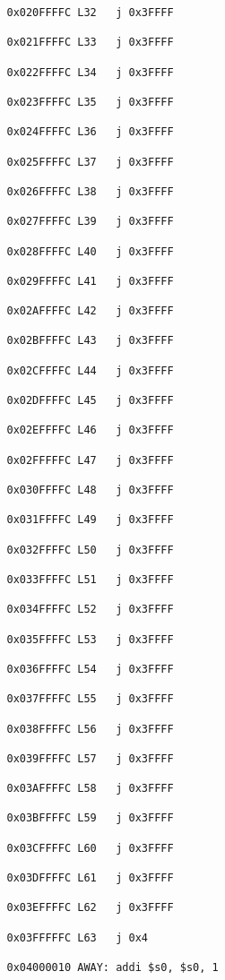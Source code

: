 \documentclass{article}
\begin{document}
\begin{verbatim}
   0x020FFFFC L32   j 0x3FFFF

   0x021FFFFC L33   j 0x3FFFF

   0x022FFFFC L34   j 0x3FFFF

   0x023FFFFC L35   j 0x3FFFF

   0x024FFFFC L36   j 0x3FFFF

   0x025FFFFC L37   j 0x3FFFF

   0x026FFFFC L38   j 0x3FFFF

   0x027FFFFC L39   j 0x3FFFF

   0x028FFFFC L40   j 0x3FFFF

   0x029FFFFC L41   j 0x3FFFF

   0x02AFFFFC L42   j 0x3FFFF

   0x02BFFFFC L43   j 0x3FFFF

   0x02CFFFFC L44   j 0x3FFFF

   0x02DFFFFC L45   j 0x3FFFF

   0x02EFFFFC L46   j 0x3FFFF

   0x02FFFFFC L47   j 0x3FFFF

   0x030FFFFC L48   j 0x3FFFF

   0x031FFFFC L49   j 0x3FFFF

   0x032FFFFC L50   j 0x3FFFF

   0x033FFFFC L51   j 0x3FFFF

   0x034FFFFC L52   j 0x3FFFF

   0x035FFFFC L53   j 0x3FFFF

   0x036FFFFC L54   j 0x3FFFF

   0x037FFFFC L55   j 0x3FFFF

   0x038FFFFC L56   j 0x3FFFF

   0x039FFFFC L57   j 0x3FFFF

   0x03AFFFFC L58   j 0x3FFFF

   0x03BFFFFC L59   j 0x3FFFF

   0x03CFFFFC L60   j 0x3FFFF

   0x03DFFFFC L61   j 0x3FFFF

   0x03EFFFFC L62   j 0x3FFFF

   0x03FFFFFC L63   j 0x4

   0x04000010 AWAY: addi $s0, $s0, 1
\end{verbatim}
\end{document}
